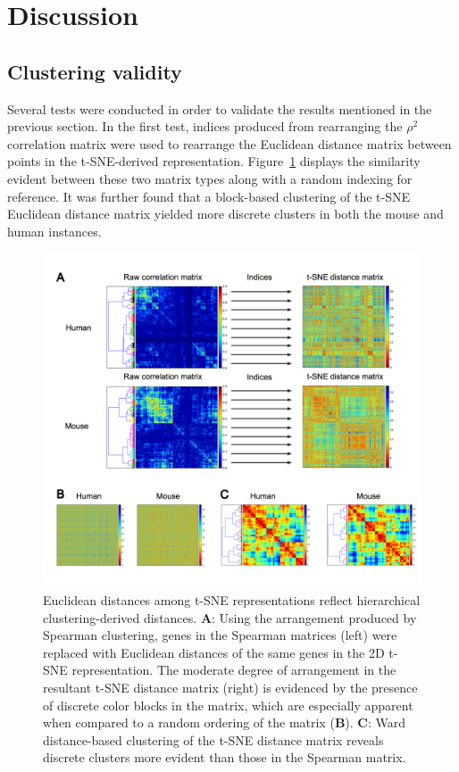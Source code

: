 \documentclass[12pt,oneside,onecolumn,a4paper]{article}
\begin{document}
\section{Discussion}

\subsection{Clustering validity}

Several tests were conducted in order to validate the results mentioned in the previous section. In the first test, indices produced from rearranging the $\rho^{2}$ correlation matrix were used to rearrange the Euclidean distance matrix between points in the t-SNE-derived representation. Figure~\ref{fig:new_matrix} displays the similarity evident between these two matrix types along with a random indexing for reference. It was further found that a block-based clustering of the t-SNE Euclidean distance matrix yielded more discrete clusters in both the mouse and human instances.

\begin{figure}[H]
\begin{center}
\includegraphics[width=\columnwidth]{figures/correlations}
\caption{Euclidean distances among t-SNE representations reflect hierarchical clustering-derived distances. \textbf{A}: Using the arrangement produced by Spearman clustering, genes in the Spearman matrices (left) were replaced with Euclidean distances of the same genes in the 2D t-SNE representation. The moderate degree of arrangement in the resultant t-SNE distance matrix (right) is evidenced by the presence of discrete color blocks in the matrix, which are especially apparent when compared to a random ordering of the matrix (\textbf{B}). \textbf{C}: Ward distance-based clustering of the t-SNE distance matrix reveals discrete clusters more evident than those in the Spearman matrix. \label{fig:new_matrix}%
}
\end{center}
\end{figure}
\end{document}
